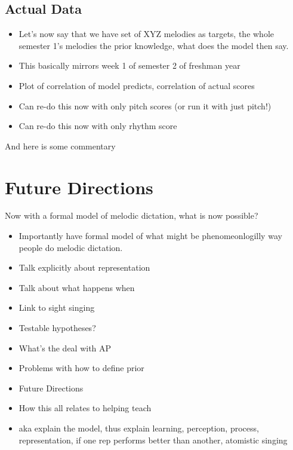 \documentclass[]{book}
\providecommand{\tightlist}{%
  \setlength{\itemsep}{0pt}\setlength{\parskip}{0pt}}
\theoremstyle{definition}
\theoremstyle{definition}
\theoremstyle{definition}
\theoremstyle{remark}
\begin{document}
\hypertarget{actual-data}{%
\subsection{Actual Data}\label{actual-data}}

\begin{itemize}
\tightlist
\item
  Let's now say that we have set of XYZ melodies as targets, the whole
  semester 1's melodies the prior knowledge, what does the model then
  say.
\item
  This basically mirrors week 1 of semester 2 of freshman year
\item
  Plot of correlation of model predicts, correlation of actual scores
\item
  Can re-do this now with only pitch scores (or run it with just pitch!)
\item
  Can re-do this now with only rhythm score
\end{itemize}

And here is some commentary

\hypertarget{future-directions}{%
\section{Future Directions}\label{future-directions}}

Now with a formal model of melodic dictation, what is now possible?

\begin{itemize}
\item
  Importantly have formal model of what might be phenomeonlogilly way
  people do melodic dictation.
\item
  Talk explicitly about representation
\item
  Talk about what happens when
\item
  Link to sight singing
\item
  Testable hypotheses?
\item
  What's the deal with AP
\item
  Problems with how to define prior
\item
  Future Directions
\item
  How this all relates to helping teach
\item
  aka explain the model, thus explain learning, perception, process,
  representation, if one rep performs better than another, atomistic
  singing
\end{itemize}
\end{document}
